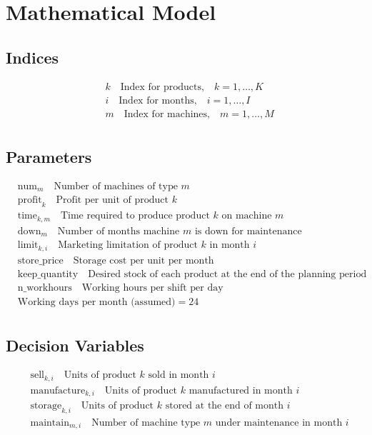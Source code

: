 \documentclass{article}
\begin{document}
\section*{Mathematical Model}

\subsection*{Indices}
\begin{align*}
    & k \quad \text{Index for products,} \quad k = 1, \ldots, K \\
    & i \quad \text{Index for months,} \quad i = 1, \ldots, I \\
    & m \quad \text{Index for machines,} \quad m = 1, \ldots, M \\
\end{align*}

\subsection*{Parameters}
\begin{align*}
    & \text{num}_{m} \quad \text{Number of machines of type } m \\
    & \text{profit}_{k} \quad \text{Profit per unit of product } k \\
    & \text{time}_{k,m} \quad \text{Time required to produce product } k \text{ on machine } m \\
    & \text{down}_{m} \quad \text{Number of months machine } m \text{ is down for maintenance} \\
    & \text{limit}_{k,i} \quad \text{Marketing limitation of product } k \text{ in month } i \\
    & \text{store\_price} \quad \text{Storage cost per unit per month} \\
    & \text{keep\_quantity} \quad \text{Desired stock of each product at the end of the planning period} \\
    & \text{n\_workhours} \quad \text{Working hours per shift per day} \\
    & \text{Working days per month (assumed)} = 24 \\
\end{align*}

\subsection*{Decision Variables}
\begin{align*}
    & \text{sell}_{k,i} \quad \text{Units of product } k \text{ sold in month } i \\
    & \text{manufacture}_{k,i} \quad \text{Units of product } k \text{ manufactured in month } i \\
    & \text{storage}_{k,i} \quad \text{Units of product } k \text{ stored at the end of month } i \\
    & \text{maintain}_{m,i} \quad \text{Number of machine type } m \text{ under maintenance in month } i \\
\end{align*}
\end{document}

